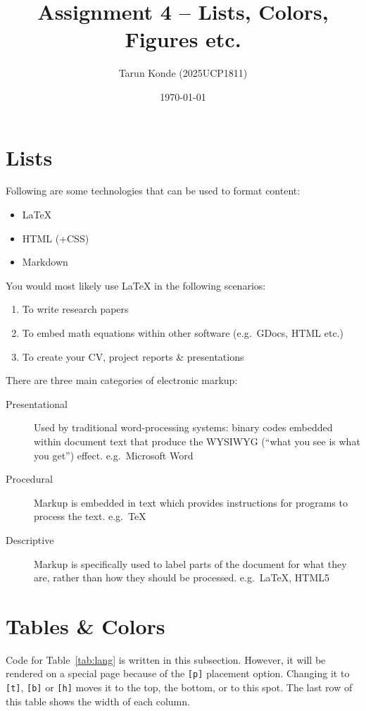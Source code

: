 \documentclass[11pt,a4paper]{article}
\title{Assignment 4 -- Lists, Colors, Figures etc.}
\author{Tarun Konde (2025UCP1811)}
\date{\today}
\begin{document}
\maketitle

\section{Lists}

Following are some technologies that can be used to format content:
\begin{itemize}
    \item \LaTeX
    \item HTML (+CSS)
    \item Markdown
\end{itemize}

You would most likely use \LaTeX{} in the following scenarios:
\begin{enumerate}
    \item To write research papers
    \item To embed math equations within other software (e.g.\ GDocs, HTML etc.)
    \item To create your CV, project reports \& presentations
\end{enumerate}

There are three main categories of electronic markup:
\begin{description}
    \item[Presentational] Used by traditional word-processing systems: binary
        codes embedded within document text that produce the WYSIWYG (``what
        you see is what you get'') effect. e.g.\ Microsoft Word
    \item[Procedural] Markup is embedded in text which provides instructions
        for programs to process the text. e.g.\ \TeX
    \item[Descriptive] Markup is specifically used to label parts of the
        document for what they are, rather than how they should be processed.
        e.g.\ \LaTeX, HTML5
\end{description}

\section{Tables \& Colors}

Code for Table~\ref{tab:lang} is written in this subsection. However, it will
be rendered on a special page because of the \texttt{[p]} placement option.
Changing it to \texttt{[t]}, \texttt{[b]} or \texttt{[h]} moves it to the top,
the bottom, or to this spot. The last row of this table shows the width of
each column.
\end{document}
